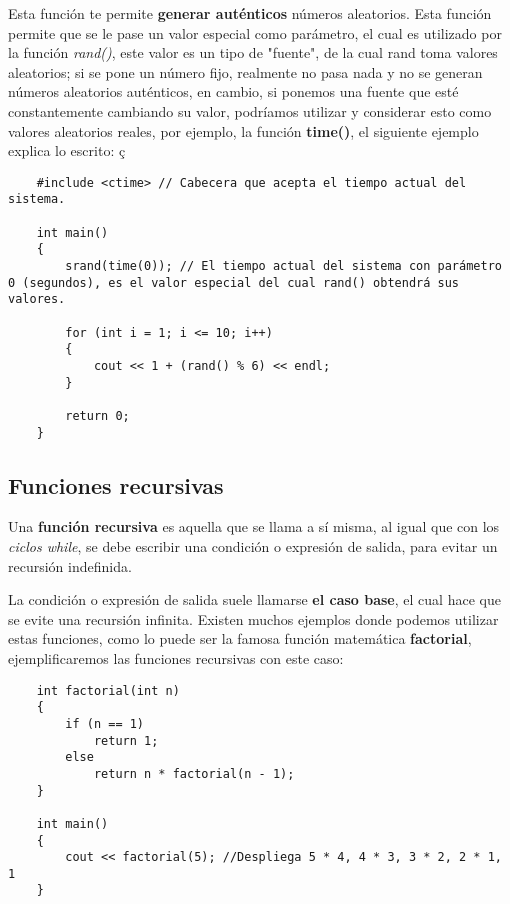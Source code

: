 Esta función te permite \textbf{generar auténticos} números aleatorios. Esta función permite que se le pase un valor especial como parámetro, el cual es utilizado por la función \textit{rand()}, este valor es un tipo de "fuente", de la cual rand toma valores aleatorios; si se pone un número fijo, realmente no pasa nada y no se generan números aleatorios auténticos, en cambio, si ponemos una fuente que esté constantemente cambiando su valor, podríamos utilizar y considerar esto como valores aleatorios reales, por ejemplo, la función \textbf{time()}, el siguiente ejemplo explica lo escrito:
ç\begin{lstlisting}
    #include <ctime> // Cabecera que acepta el tiempo actual del sistema.

    int main()
    {
        srand(time(0)); // El tiempo actual del sistema con parámetro 0 (segundos), es el valor especial del cual rand() obtendrá sus valores.
        
        for (int i = 1; i <= 10; i++)
        {
            cout << 1 + (rand() % 6) << endl;
        }
        
        return 0;
    }
\end{lstlisting}


\subsection{Funciones recursivas}

Una \textbf{función recursiva} es aquella que se llama a sí misma, al igual que con los \textit{ciclos while}, se debe escribir una condición o expresión de salida, para evitar un recursión indefinida.

La condición o expresión de salida suele llamarse \textbf{el caso base}, el cual hace que se evite una recursión infinita. Existen muchos ejemplos donde podemos utilizar estas funciones, como lo puede ser la famosa función matemática \textbf{factorial}, ejemplificaremos las funciones recursivas con este caso:
\begin{lstlisting}
    int factorial(int n)
    {
        if (n == 1)
            return 1;
        else
            return n * factorial(n - 1);
    }
    
    int main()
    {
        cout << factorial(5); //Despliega 5 * 4, 4 * 3, 3 * 2, 2 * 1, 1
    }
\end{lstlisting}
